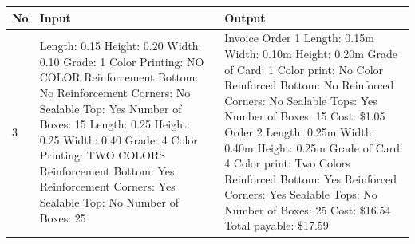 \documentclass[12pt]{article}
\begin{document}
\begin{tabular}{| p{1cm} | p{6cm} | p{6cm} |}
	\hline
	\textbf{No} & \textbf{Input} & \textbf{Output} \\ \hline
	3 & Length: 0.15\newline
	Height: 0.20\newline
	Width: 0.10\newline
	Grade: 1\newline
	Color Printing: NO COLOR\newline
	Reinforcement Bottom: No\newline
	Reinforcement Corners: No\newline
	Sealable Top: Yes\newline
	Number of Boxes: 15\newline
	\newline
	Length: 0.25\newline
	Height: 0.25\newline
	Width: 0.40\newline
	Grade: 4\newline
	Color Printing: TWO COLORS\newline
	Reinforcement Bottom: Yes\newline
	Reinforcement Corners: Yes\newline
	Sealable Top: No\newline
	Number of Boxes: 25 & Invoice\newline
	\newline
	Order 1\newline
	Length: 0.15m\newline
	Width: 0.10m\newline
	Height: 0.20m\newline
	Grade of Card: 1\newline
	Color print: No Color\newline
	Reinforced Bottom: No\newline
	Reinforced Corners: No\newline
	Sealable Tops: Yes\newline
	Number of Boxes: 15\newline
	Cost: \$1.05\newline
	\newline
	Order 2\newline
	Length: 0.25m\newline
	Width: 0.40m\newline
	Height: 0.25m\newline
	Grade of Card: 4\newline
	Color print: Two Colors\newline
	Reinforced Bottom: Yes\newline
	Reinforced Corners: Yes\newline
	Sealable Tops: No\newline
	Number of Boxes: 25\newline
	Cost: \$16.54\newline
	\newline
	Total payable: \$17.59 \\ \hline
\end{tabular}
\newpage
\end{document}
